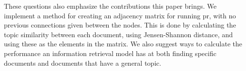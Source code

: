 These questions also emphasize the contributions this paper brings.
We implement a method for creating an adjacency matrix for running \gls{pr}, with no previous connections given between the nodes.
This is done by calculating the topic similarity between each document, using Jensen-Shannon distance, and using these as the elements in the matrix.
We also suggest ways to calculate the performance an information retrieval model has at both finding specific documents and documents that have a general topic.